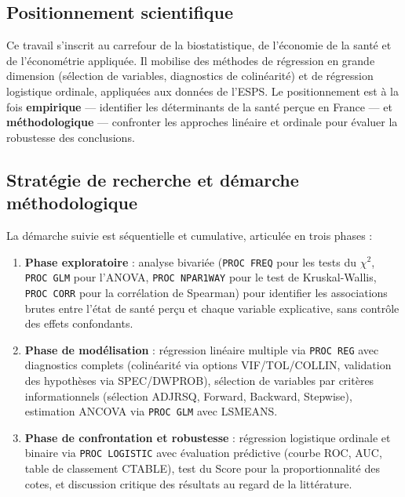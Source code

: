 \documentclass[11pt,a4paper]{memoirerecherche}
\providecommand{\tightlist}{%
  \setlength{\itemsep}{0pt}\setlength{\parskip}{0pt}}
\begin{document}
\hypertarget{positionnement-scientifique}{%
\subsection{Positionnement scientifique}\label{positionnement-scientifique}}

Ce travail s'inscrit au carrefour de la biostatistique, de l'économie de la santé et de l'économétrie appliquée. Il mobilise des méthodes de régression en grande dimension (sélection de variables, diagnostics de colinéarité) et de régression logistique ordinale, appliquées aux données de l'ESPS. Le positionnement est à la fois \textbf{empirique} --- identifier les déterminants de la santé perçue en France --- et \textbf{méthodologique} --- confronter les approches linéaire et ordinale pour évaluer la robustesse des conclusions.

\hypertarget{stratuxe9gie-de-recherche-et-duxe9marche-muxe9thodologique}{%
\subsection{Stratégie de recherche et démarche méthodologique}\label{stratuxe9gie-de-recherche-et-duxe9marche-muxe9thodologique}}

La démarche suivie est séquentielle et cumulative, articulée en trois phases :

\begin{enumerate}
\def\labelenumi{\arabic{enumi}.}
\tightlist
\item
  \textbf{Phase exploratoire} : analyse bivariée (\texttt{PROC\ FREQ} pour les tests du \(\chi^2\), \texttt{PROC\ GLM} pour l'ANOVA, \texttt{PROC\ NPAR1WAY} pour le test de Kruskal-Wallis, \texttt{PROC\ CORR} pour la corrélation de Spearman) pour identifier les associations brutes entre l'état de santé perçu et chaque variable explicative, sans contrôle des effets confondants.
\item
  \textbf{Phase de modélisation} : régression linéaire multiple via \texttt{PROC\ REG} avec diagnostics complets (colinéarité via options VIF/TOL/COLLIN, validation des hypothèses via SPEC/DWPROB), sélection de variables par critères informationnels (sélection ADJRSQ, Forward, Backward, Stepwise), estimation ANCOVA via \texttt{PROC\ GLM} avec LSMEANS.
\item
  \textbf{Phase de confrontation et robustesse} : régression logistique ordinale et binaire via \texttt{PROC\ LOGISTIC} avec évaluation prédictive (courbe ROC, AUC, table de classement CTABLE), test du Score pour la proportionnalité des cotes, et discussion critique des résultats au regard de la littérature.
\end{enumerate}
\end{document}
